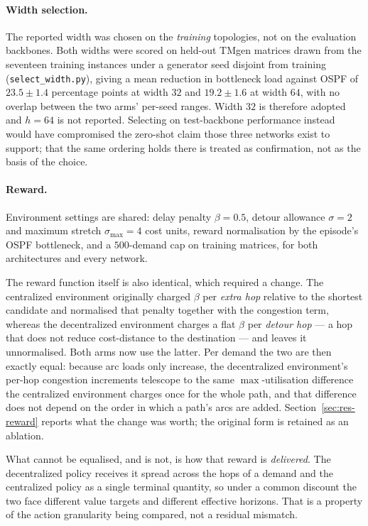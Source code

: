 \paragraph{Width selection.} The reported width was chosen on the \emph{training}
topologies, not on the evaluation backbones. Both widths were scored on held-out
TMgen matrices drawn from the seventeen training instances under a generator seed
disjoint from training (\texttt{select\_width.py}), giving a mean reduction in
bottleneck load against OSPF of $23.5 \pm 1.4$ percentage points at width $32$
and $19.2 \pm 1.6$ at width $64$, with no overlap between the two arms' per-seed
ranges. Width $32$ is therefore adopted and $h{=}64$ is not reported. Selecting on
test-backbone performance instead would have compromised the zero-shot claim those
three networks exist to support; that the same ordering holds there is treated as
confirmation, not as the basis of the choice.

\paragraph{Reward.} Environment settings are shared: delay penalty
$\beta = 0.5$, detour allowance $\sigma = 2$ and maximum stretch
$\sigma_{\max} = 4$ cost units, reward normalisation by the episode's OSPF
bottleneck, and a $500$-demand cap on training matrices, for both architectures
and every network.

The reward function itself is also identical, which required a change. The
centralized environment originally charged $\beta$ per \emph{extra hop} relative
to the shortest candidate and normalised that penalty together with the
congestion term, whereas the decentralized environment charges a flat $\beta$ per
\emph{detour hop} --- a hop that does not reduce cost-distance to the destination
--- and leaves it unnormalised. Both arms now use the latter. Per demand the two
are then exactly equal: because arc loads only increase, the decentralized
environment's per-hop congestion increments telescope to the same
$\max$-utilisation difference the centralized environment charges once for the
whole path, and that difference does not depend on the order in which a path's
arcs are added. Section~\ref{sec:res-reward} reports what the change was worth;
the original form is retained as an ablation.

What cannot be equalised, and is not, is how that reward is \emph{delivered}. The
decentralized policy receives it spread across the hops of a demand and the
centralized policy as a single terminal quantity, so under a common discount the
two face different value targets and different effective horizons. That is a
property of the action granularity being compared, not a residual mismatch.

